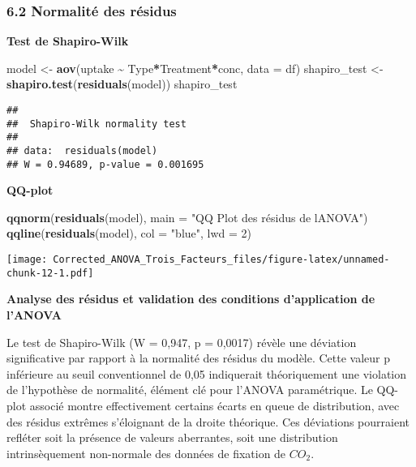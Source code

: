 \documentclass[
]{article}
\newenvironment{Shaded}{\begin{snugshade}}{\end{snugshade}}
\newcommand{\AttributeTok}[1]{\textcolor[rgb]{0.13,0.29,0.53}{#1}}
\newcommand{\DecValTok}[1]{\textcolor[rgb]{0.00,0.00,0.81}{#1}}
\newcommand{\FunctionTok}[1]{\textcolor[rgb]{0.13,0.29,0.53}{\textbf{#1}}}
\newcommand{\NormalTok}[1]{#1}
\newcommand{\OtherTok}[1]{\textcolor[rgb]{0.56,0.35,0.01}{#1}}
\newcommand{\SpecialCharTok}[1]{\textcolor[rgb]{0.81,0.36,0.00}{\textbf{#1}}}
\newcommand{\StringTok}[1]{\textcolor[rgb]{0.31,0.60,0.02}{#1}}
\begin{document}
\subsubsection{6.2 Normalité des
résidus}\label{normalituxe9-des-ruxe9sidus}

\textbf{Test de Shapiro-Wilk}

\begin{Shaded}
\begin{Highlighting}[]
\NormalTok{model }\OtherTok{\textless{}{-}} \FunctionTok{aov}\NormalTok{(uptake }\SpecialCharTok{\textasciitilde{}}\NormalTok{ Type}\SpecialCharTok{*}\NormalTok{Treatment}\SpecialCharTok{*}\NormalTok{conc, }\AttributeTok{data =}\NormalTok{ df)}
\NormalTok{shapiro\_test }\OtherTok{\textless{}{-}} \FunctionTok{shapiro.test}\NormalTok{(}\FunctionTok{residuals}\NormalTok{(model))}
\NormalTok{shapiro\_test}
\end{Highlighting}
\end{Shaded}

\begin{verbatim}
## 
##  Shapiro-Wilk normality test
## 
## data:  residuals(model)
## W = 0.94689, p-value = 0.001695
\end{verbatim}

\textbf{QQ-plot}

\begin{Shaded}
\begin{Highlighting}[]
\FunctionTok{qqnorm}\NormalTok{(}\FunctionTok{residuals}\NormalTok{(model), }\AttributeTok{main =} \StringTok{"QQ Plot des résidus de l\textquotesingle{}ANOVA"}\NormalTok{)}
\FunctionTok{qqline}\NormalTok{(}\FunctionTok{residuals}\NormalTok{(model), }\AttributeTok{col =} \StringTok{"blue"}\NormalTok{, }\AttributeTok{lwd =} \DecValTok{2}\NormalTok{)}
\end{Highlighting}
\end{Shaded}

\texttt{[image: Corrected\_ANOVA\_Trois\_Facteurs\_files/figure-latex/unnamed-chunk-12-1.pdf]}

\textbf{Analyse des résidus et validation des conditions d'application
de l'ANOVA}

Le test de Shapiro-Wilk (W = 0,947, p = 0,0017) révèle une déviation
significative par rapport à la normalité des résidus du modèle. Cette
valeur p inférieure au seuil conventionnel de 0,05 indiquerait
théoriquement une violation de l'hypothèse de normalité, élément clé
pour l'ANOVA paramétrique. Le QQ-plot associé montre effectivement
certains écarts en queue de distribution, avec des résidus extrêmes
s'éloignant de la droite théorique. Ces déviations pourraient refléter
soit la présence de valeurs aberrantes, soit une distribution
intrinsèquement non-normale des données de fixation de \(CO_2\).
\end{document}

